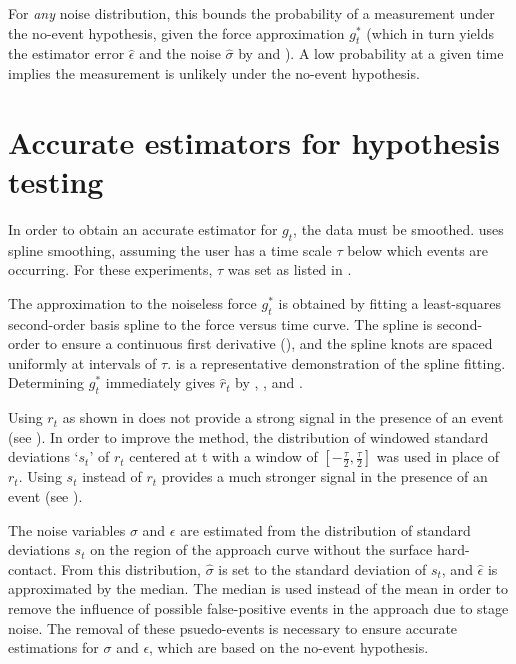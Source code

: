 

For \emph{any} noise distribution, this bounds the probability of a measurement under the no-event hypothesis, given the force approximation $g^{*}_t$ (which in turn yields the estimator error $\hat{\epsilon}$ and the noise $\hat{\sigma}$ by  and ). A low probability at a given time implies the measurement is unlikely under the no-event hypothesis. \pl

\section{Accurate estimators for hypothesis testing}

\firstp In order to obtain an accurate estimator for $g_t$, the data must be smoothed. \name{} uses spline smoothing, assuming the user has a time scale $\tau$ below which events are occurring. For these experiments, $\tau$ was set as listed in . \pl 

The approximation to the noiseless force $g^{*}_t$ is obtained by fitting a least-squares second-order basis spline to the force versus time curve. The spline is second-order to ensure a continuous first derivative (), and the spline knots are spaced uniformly at intervals of $\tau$.  is a representative demonstration of the spline fitting. Determining  $g^{*}_t$ immediately gives $\hat{r}_t$ by  , , and . \pl

Using $r_t$ as shown in  does not provide a strong signal in the presence of an event (see ). In order to improve the method, the distribution of windowed standard deviations `$s_t$' of $r_t$ centered at t with a window of $[-\frac{\tau}{2},\frac{\tau}{2}]$ was used in place of $r_t$. Using $s_t$ instead of $r_t$ provides a much stronger signal in the presence of an event (see ).  \pl

The noise variables $\sigma$ and $\epsilon$ are estimated from the distribution of standard deviations $s_t$ on the region of the approach curve without the surface hard-contact. From this distribution, $\hat{\sigma}$ is set to the standard deviation of $s_t$, and $\hat{\epsilon}$ is approximated by the median. The median is used instead of the mean in order to remove the influence of possible false-positive events in the approach due to stage noise. The removal of these psuedo-events is necessary to ensure accurate estimations for $\sigma$ and $\epsilon$, which are based on the no-event hypothesis. \pl


